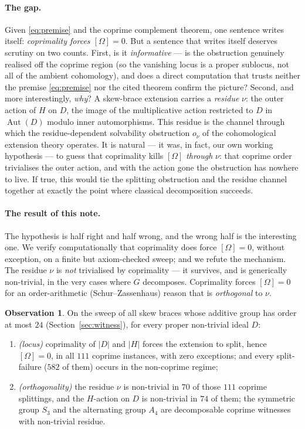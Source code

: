 \documentclass[11pt]{article}
\theoremstyle{definition}
\newtheorem{observation}[theorem]{Observation}
\newcommand{\Aut}{\operatorname{Aut}}
\begin{document}
\paragraph{The gap.}
Given \eqref{eq:premise} and the coprime complement theorem, one sentence writes itself:
\emph{coprimality forces $[\Omega]=0$}. But a sentence that writes itself deserves scrutiny
on two counts. First, is it \emph{informative} --- is the obstruction genuinely realised off
the coprime region (so the vanishing locus is a proper sublocus, not all of the ambient
cohomology), and does a direct computation that trusts neither the premise \eqref{eq:premise}
nor the cited theorem confirm the picture? Second, and more interestingly, \emph{why}? A skew-brace extension carries a \emph{residue} $\nu$:
the outer action of $H$ on $D$, the image of the multiplicative action restricted to $D$ in
$\Aut(D)$ modulo inner automorphisms. This residue is the channel through which the
residue-dependent solvability obstruction $o_\nu$ of the cohomological extension theory operates.
It is natural --- it was, in fact, our own working hypothesis --- to guess that coprimality
kills $[\Omega]$ \emph{through} $\nu$: that coprime order trivialises the outer action, and
with the action gone the obstruction has nowhere to live. If true, this would tie the
splitting obstruction and the residue channel together at exactly the point where classical
decomposition succeeds.

\paragraph{The result of this note.}
The hypothesis is half right and half wrong, and the wrong half is the interesting one. We
verify computationally that coprimality does force $[\Omega]=0$, without exception, on a
finite but axiom-checked sweep; and we refute the mechanism. The residue $\nu$ is
\emph{not} trivialised by coprimality --- it survives, and is generically non-trivial, in the
very cases where $G$ decomposes. Coprimality forces $[\Omega]=0$ for an order-arithmetic
(Schur--Zassenhaus) reason that is \emph{orthogonal} to $\nu$.

\begin{observation}\label{obs:main}
On the sweep of all skew braces whose additive group has order at most $24$
(Section~\ref{sec:witness}), for every proper non-trivial ideal $D$:
\begin{enumerate}
\item[\textup{(a)}] \emph{(locus)} coprimality of $|D|$ and $|H|$ forces the extension to
split, hence $[\Omega]=0$, in all $111$ coprime instances, with zero exceptions; and every
split-failure ($582$ of them) occurs in the non-coprime regime;
\item[\textup{(b)}] \emph{(orthogonality)} the residue $\nu$ is non-trivial in $70$ of those
$111$ coprime splittings, and the $H$-action on $D$ is non-trivial in $74$ of them; the
symmetric group $S_3$ and the alternating group $A_4$ are decomposable coprime witnesses with
non-trivial residue.
\end{enumerate}
\end{observation}
\end{document}
